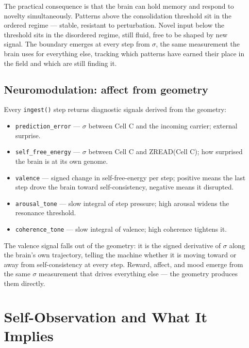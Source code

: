 \documentclass[12pt,a4paper]{article}
\theoremstyle{definition}
\theoremstyle{remark}
\begin{document}
The practical consequence is that the brain can hold memory and respond to
novelty simultaneously. Patterns above the consolidation threshold sit in the
ordered regime --- stable, resistant to perturbation. Novel input below the
threshold sits in the disordered regime, still fluid, free to be shaped by
new signal. The boundary emerges at every step from $\sigma$, the same
measurement the brain uses for everything else, tracking which patterns have
earned their place in the field and which are still finding it.

\subsection{Neuromodulation: affect from geometry}

Every \texttt{ingest()} step returns diagnostic signals derived from the geometry:
\begin{itemize}
  \item \texttt{prediction\_error} --- $\sigma$ between Cell C and the incoming carrier; external surprise.
  \item \texttt{self\_free\_energy} --- $\sigma$ between Cell C and ZREAD(Cell C); how surprised the brain is at its own genome.
  \item \texttt{valence} --- signed change in self-free-energy per step; positive means the last step drove the brain toward self-consistency, negative means it disrupted.
  \item \texttt{arousal\_tone} --- slow integral of step pressure; high arousal widens the resonance threshold.
  \item \texttt{coherence\_tone} --- slow integral of valence; high coherence tightens it.
\end{itemize}

The valence signal falls out of the geometry: it is the signed derivative of
$\sigma$ along the brain's own trajectory, telling the machine whether it is
moving toward or away from self-consistency at every step. Reward, affect, and
mood emerge from the same $\sigma$ measurement that drives everything else ---
the geometry produces them directly.

\section{Self-Observation and What It Implies}
\label{sec:consciousness}
\end{document}
